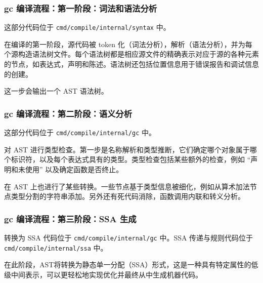 \documentclass[xcolor=table,dvipsnames,svgnames,aspectratio=169]{ctexbeamer}
\begin{document}
\begin{frame}
  \frametitle{gc 编译流程：第一阶段：词法和语法分析}

  这部分代码位于 \lstinline|cmd/compile/internal/syntax| 中。

  在编译的第一阶段，源代码被 token 化（词法分析），解析（语法分析），并为每个源构造语法树文件。每个语法树都是相应源文件的精确表示对应于源的各种元素的节点，如表达式，声明和陈述。语法树还包括位置信息用于错误报告和调试信息的创建。
  
  这一步会输出一个 AST 语法树。
\end{frame}

\begin{frame}
  \frametitle{gc 编译流程：第二阶段：语义分析}

  这部分代码位于 \lstinline|cmd/compile/internal/gc| 中。

  对 AST 进行类型检查。第一步是名称解析和类型推断，它们确定哪个对象属于哪个标识符，以及每个表达式具有的类型。类型检查包括某些额外的检查，例如 “声明和未使用” 以及确定函数是否终止。

在 AST 上也进行了某些转换。一些节点基于类型信息被细化，例如从算术加法节点类型分割的字符串添加。另外还有死代码消除，函数调用内联和转义分析。

\end{frame}

\begin{frame}
  \frametitle{gc 编译流程：第三阶段：SSA 生成}

  转换为 SSA 代码位于 \lstinline|cmd/compile/internal/gc| 中。SSA 传递与规则代码位于 \lstinline|cmd/compile/internal/ssa| 中。

  在此阶段，AST将转换为静态单一分配（SSA）形式，这是一种具有特定属性的低级中间表示，可以更轻松地实现优化并最终从中生成机器代码。

\end{frame}
\end{document}
